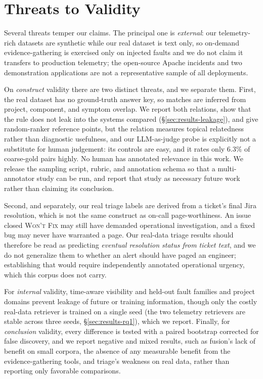 \section{Threats to Validity}
\label{sec:threats}

Several threats temper our claims. The principal one is \emph{external}: our
telemetry-rich datasets are synthetic while our real dataset is text only, so
on-demand evidence-gathering is exercised only on injected faults and we
do not claim it transfers to production telemetry; the open-source Apache
incidents and two demonstration applications are not a representative sample of
all deployments.

On \emph{construct} validity there are two distinct threats, and we separate
them. First, the real dataset has no ground-truth answer key, so matches are
inferred from project, component, and symptom overlap. We report both relations,
show that the rule does not leak into the systems compared
(\S\ref{sec:results-leakage}), and give random-ranker reference points, but the
relation measures topical relatedness rather than diagnostic usefulness, and our
LLM-as-judge probe is explicitly not a substitute for human judgement: its
controls are easy, and it rates only $6.3\%$ of coarse-gold pairs highly. No
human has annotated relevance in this work. We release the sampling script,
rubric, and annotation schema so that a multi-annotator study can be run, and
report that study as necessary future work rather than claiming its conclusion.

Second, and separately, our real triage labels are derived from a ticket's final
Jira resolution, which is not the same construct as on-call page-worthiness. An
issue closed \textsc{Won't Fix} may still have demanded operational
investigation, and a fixed bug may never have warranted a page. Our real-data
triage results should therefore be read as predicting \emph{eventual resolution
status from ticket text}, and we do not generalize them to whether an alert
should have paged an engineer; establishing that would require independently
annotated operational urgency, which this corpus does not carry.

For \emph{internal}
validity, time-aware visibility and held-out fault families and project domains
prevent leakage of future or training information, though only the costly
real-data retriever is trained on a single seed (the two telemetry retrievers are
stable across three seeds, \S\ref{sec:results-rq1}), which we report.
Finally, for \emph{conclusion} validity, every difference is tested with a paired
bootstrap corrected for false discovery, and we report negative and mixed results,
such as fusion's lack of benefit on small corpora, the absence of any measurable
benefit from the evidence-gathering tools, and triage's weakness on real
data, rather than reporting only favorable comparisons.
